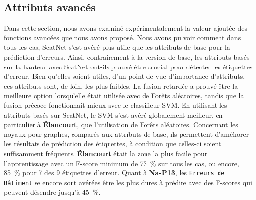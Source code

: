     \subsection*{Attributs avancés}
        Dans cette section, nous avons examiné expérimentalement la valeur ajoutée des fonctions avancées que nous avons proposé.
        Nous avons pu voir comment dans tous les cas, ScatNet s'est avéré plus utile que les attributs de base pour la prédiction d'erreurs.
        Ainsi, contrairement à la version de base, les attributs basés sur la hauteur avec ScatNet ont-ils prouvé être crucial pour détecter les étiquettes d'erreur.
        Bien qu'elles soient utiles, d'un point de vue d'importance d'attributs, ces attributs sont, de loin, les plus faibles.
        La fusion retardée a prouvé être la meilleure option lorsqu'elle était utilisée avec de Forêts aléatoires, tandis que la fusion précoce fonctionnait mieux avec le classifieur SVM.
        En utilisant les attributs basés sur ScatNet, le SVM s'est avéré globalement meilleur, en particulier à \textbf{\'Elancourt}, que l'utilisation de Forêts aléatoires.
        Concernant les noyaux pour graphes, comparés aux attributs de base, ils permettent d'améliorer les résultats de prédiction des étiquettes, à condition que celles-ci soient suffisamment fréquents.
        \textbf{\'Elancourt} était la zone la plus facile pour l'apprentissage avec un F-score minimum de \SI{73}{\percent} sur tous les cas, ou encore, \SI{85}{\percent} pour 7 des 9 étiquettes d'erreur.
        Quant à \textbf{Na-P13}, les \texttt{Erreurs de Bâtiment} se encore sont avérées être les plus dures à prédire avec des F-scores qui peuvent désendre jusqu'à \SI{45}{\percent}.
        

